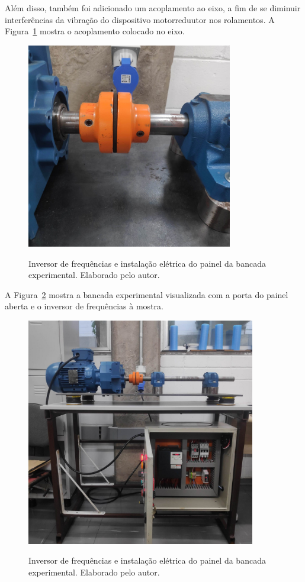 \documentclass[
	12pt,				
	oneside,			
	a4paper,			
	english,			
	brazil,			
	]{abntex2ppgsi}
\begin{document}
Além disso, também foi adicionado um acoplamento ao eixo, a fim de se diminuir interferências da vibração do dispositivo motorreduutor nos rolamentos. A Figura~\ref{acoplamento_eixo} mostra o acoplamento colocado no eixo. 

\begin{figure}[H]
\centering
\caption {Inversor de frequências e instalação elétrica do painel da bancada experimental. Elaborado pelo autor.}
\includegraphics[width=\textwidth,height=90mm,keepaspectratio]{acoplamento_eixo}
\label{acoplamento_eixo}
\end{figure}
 
A Figura~\ref{bancada_aberta} mostra a bancada experimental visualizada com a porta do painel aberta e o inversor de frequências à mostra.
 
\begin{figure}[H]
\centering
\caption {Inversor de frequências e instalação elétrica do painel da bancada experimental. Elaborado pelo autor.}
\includegraphics[width=\textwidth,height=100mm,keepaspectratio]{bancada_aberta}
\label{bancada_aberta}
\end{figure}
  
\end{document}

